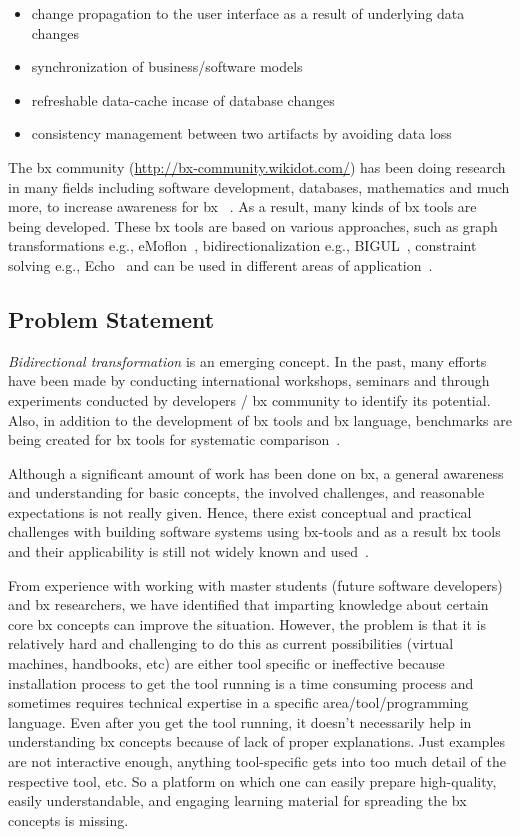 \begin{itemize}
	\item {change propagation to the user interface as a result of underlying data changes}	
	\item {synchronization of business/software models}
	\item {refreshable data-cache incase of database changes}
	\item {consistency management between two artifacts by avoiding data loss}
\end{itemize}

The bx community (\url{http://bx-community.wikidot.com/}) has been doing research in many fields including software development, databases, mathematics and much more, to increase awareness for bx ~\cite{bx-grace}\cite{bx-dagstuhl}. As a result, many kinds of bx tools are being developed. These bx tools are based on various approaches, such as graph transformations e.g., eMoflon~\cite{emoflon-part4}, bidirectionalization e.g., BIGUL~\cite{bigul}, constraint solving e.g., Echo~\cite{echo} and can be used in different areas of application~\cite{bx-community}.

\subsection{Problem Statement}\label{subsec:probstmt}
\textit{Bidirectional transformation} is an emerging concept. In the past, many efforts have been made by conducting international workshops, seminars and through experiments conducted by developers / bx community to identify its potential. Also, in addition to the development of bx tools and bx language, benchmarks are being created for bx tools for systematic comparison~\cite{benchmark-BX}.

Although a significant amount of work has been done on bx, a general awareness and understanding for basic concepts, the involved challenges, and reasonable expectations is not really given. Hence, there exist conceptual and practical challenges with building software systems using bx-tools and as a result bx tools and their applicability is still not widely known and used~\cite{bx-theoryandappl}.

From experience with working with master students (future software developers) and bx researchers, we have identified that imparting knowledge about certain core bx concepts can improve the situation. However, the problem is that it is relatively hard and challenging to do this as current possibilities (virtual machines, handbooks, etc) are either tool specific or ineffective because installation process to get the tool running is a time consuming process and sometimes requires technical expertise in a specific area/tool/programming language. Even after you get the tool running, it doesn't necessarily help in understanding bx concepts because of lack of proper explanations. Just examples are not interactive enough, anything tool-specific gets into too much detail of the respective tool, etc.  So a platform on which one can easily prepare high-quality, easily understandable, and engaging learning material for spreading the bx concepts is missing.

